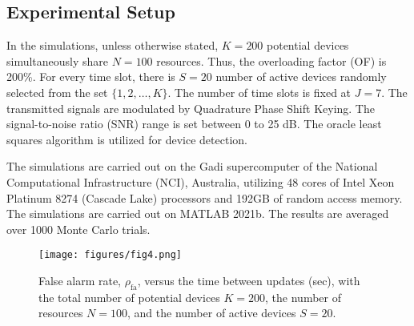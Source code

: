 \documentclass[journal,10pt]{IEEEtran}
\begin{document}
\subsection{Experimental Setup}
In the simulations, unless otherwise stated, $K = 200$ potential devices simultaneously share $N = 100$ resources. Thus, the overloading factor (OF) is 200\%. For every time slot, there is $S = 20$ number of active devices randomly selected from the set $\{1, 2, \hdots, K\}$. The number of time slots is fixed at $J = 7$. The transmitted signals are modulated by Quadrature Phase Shift Keying. The signal-to-noise ratio (SNR) range is set between 0 to 25 dB. The oracle least squares algorithm is utilized for device detection.

The simulations are carried out on the Gadi supercomputer of the National Computational Infrastructure (NCI), Australia, utilizing 48 cores of Intel Xeon Platinum 8274 (Cascade Lake) processors and 192GB of random access memory. The simulations are carried out on MATLAB 2021b. The results are averaged over 1000 Monte Carlo trials.


\begin{figure}[t] 
\centering
\texttt{[image: figures/fig4.png]}
\caption{False alarm rate, $\rho_{\mathrm{fa}}$, versus the time between updates (sec), with the total number of potential devices $K = 200$, the number of resources $N = 100$, and the number of active devices $S = 20$.}
\label{falsealarmrate}
\end{figure}
\end{document}
